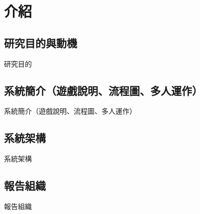 \chapter{介紹}
\section{研究目的與動機}

    研究目的

\section{系統簡介（遊戲說明、流程圖、多人運作）}

    系統簡介（遊戲說明、流程圖、多人運作）

\section{系統架構}

    系統架構
    
\section{報告組織}

	報告組織
